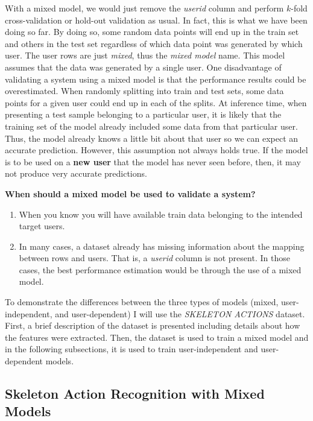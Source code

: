 \documentclass[
  11pt,
]{krantz}
\providecommand{\tightlist}{%
  \setlength{\itemsep}{0pt}\setlength{\parskip}{0pt}}
\begin{document}
With a mixed model, we would just remove the \emph{userid} column and perform \(k\)-fold cross-validation or hold-out validation as usual. In fact, this is what we have been doing so far. By doing so, some random data points will end up in the train set and others in the test set regardless of which data point was generated by which user. The user rows are just \emph{mixed}, thus the \emph{mixed model} name. This model assumes that the data was generated by a single user. One disadvantage of validating a system using a mixed model is that the performance results could be overestimated. When randomly splitting into train and test sets, some data points for a given user could end up in each of the splits. At inference time, when presenting a test sample belonging to a particular user, it is likely that the training set of the model already included some data from that particular user. Thus, the model already knows a little bit about that user so we can expect an accurate prediction. However, this assumption not always holds true. If the model is to be used on a \textbf{new user} that the model has never seen before, then, it may not produce very accurate predictions.

\textbf{When should a mixed model be used to validate a system?}

\begin{enumerate}
\def\labelenumi{\arabic{enumi}.}
\tightlist
\item
  When you know you will have available train data belonging to the intended target users.
\item
  In many cases, a dataset already has missing information about the mapping between rows and users. That is, a \emph{userid} column is not present. In those cases, the best performance estimation would be through the use of a mixed model.
\end{enumerate}

To demonstrate the differences between the three types of models (mixed, user-independent, and user-dependent) I will use the \emph{SKELETON ACTIONS} dataset. First, a brief description of the dataset is presented including details about how the features were extracted. Then, the dataset is used to train a mixed model and in the following subsections, it is used to train user-independent and user-dependent models.

\hypertarget{skeleton-action-recognition-with-mixed-models}{%
\subsection{Skeleton Action Recognition with Mixed Models}\label{skeleton-action-recognition-with-mixed-models}}
\end{document}
